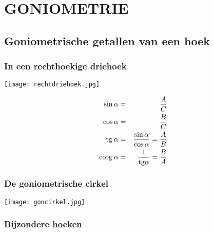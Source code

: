 \section{GONIOMETRIE} \label{goniometrie}
\hypertarget{goniometrie}{}

\subsection{Goniometrische getallen van een hoek} \label{goniometrische_getallen}
\hypertarget{goniometrische_getallen}{}

\subsubsection{In een rechthoekige driehoek} \label{rechthoekige_driehoek}
\hypertarget{rechthoekige_driehoek}{}

\begin{center}
\texttt{[image: rechtdriehoek.jpg]}
\end{center}
\begin{eqnarray*}
\sin\alpha&=&\displaystyle\frac{\displaystyle A}{\displaystyle C}\\
\cos\alpha&=&\displaystyle\frac{\displaystyle B}{\displaystyle C}\\
\mbox{tg}\:\alpha&=&\displaystyle\frac{\displaystyle \sin\alpha}{\displaystyle \cos\alpha}=\displaystyle\frac{\displaystyle A}{\displaystyle B}\\
\mbox{cotg}\:\alpha&=&\displaystyle\frac{\displaystyle 1}{\displaystyle \mbox{tg}\alpha}=\displaystyle\frac{\displaystyle B}{\displaystyle A}
\end{eqnarray*}

\subsubsection{De goniometrische cirkel} \label{goniometrische_cirkel}
\hypertarget{goniometrische_cirkel}{}

\begin{center}
\texttt{[image: goncirkel.jpg]}
\end{center}

\subsubsection{Bijzondere hoeken} \label{bijzondere_hoeken}
\hypertarget{bijzondere_hoeken}{}

